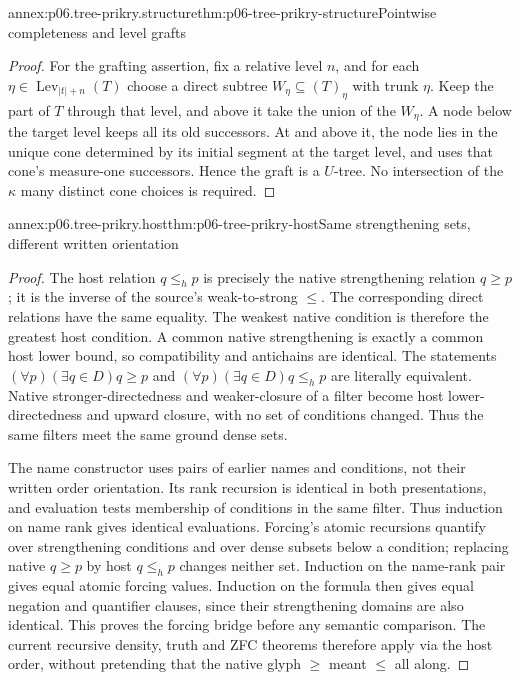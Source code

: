 \begin{annexitem}{annex:p06.tree-prikry.structure}{thm:p06-tree-prikry-structure}{Pointwise completeness and level grafts}
\begin{proof}
For the grafting assertion, fix a relative level \(n\), and for each
\(\eta\in\operatorname{Lev}_{|t|+n}(T)\) choose
a direct subtree \(W_\eta\subseteq(T)_\eta\) with trunk \(\eta\).
Keep the part of \(T\) through that level, and above it take the union
of the \(W_\eta\). A node below the target level keeps all its old
successors. At and above it, the node lies in the unique cone determined
by its initial segment at the target level, and uses that cone's
measure-one successors. Hence the graft is a \(U\)-tree. No intersection
of the \(\kappa\) many distinct cone choices is required.
\end{proof}
\end{annexitem}

\begin{annexitem}{annex:p06.tree-prikry.host}{thm:p06-tree-prikry-host}{Same strengthening sets, different written orientation}
\begin{proof}
The host relation \(q\leq_h p\) is precisely the native strengthening
relation \(q\geq p\); it is the inverse of the source's weak-to-strong
\(\leq\). The corresponding direct relations have the same equality.
The weakest native condition is therefore the greatest host condition.
A common native strengthening is exactly a common host lower bound,
so compatibility and antichains are identical. The statements
\((\forall p)(\exists q\in D)q\geq p\) and
\((\forall p)(\exists q\in D)q\leq_h p\) are literally equivalent.
Native stronger-directedness and weaker-closure of a filter become host
lower-directedness and upward closure, with no set of conditions changed.
Thus the same filters meet the same ground dense sets.

The name constructor uses pairs of earlier names and conditions, not
their written order orientation. Its rank recursion is identical in
both presentations, and evaluation tests membership of conditions in
the same filter. Thus induction on name rank gives identical evaluations.
Forcing's atomic recursions quantify over strengthening conditions and
over dense subsets below a condition; replacing native \(q\geq p\)
by host \(q\leq_h p\) changes neither set. Induction on the name-rank
pair gives equal atomic forcing values. Induction on the formula then
gives equal negation and quantifier clauses, since their strengthening
domains are also identical. This proves the forcing bridge before any
semantic comparison. The current recursive density, truth and ZFC
theorems therefore apply via the host order, without pretending that
the native glyph \(\geq\) meant \(\leq\) all along.
\end{proof}
\end{annexitem}

